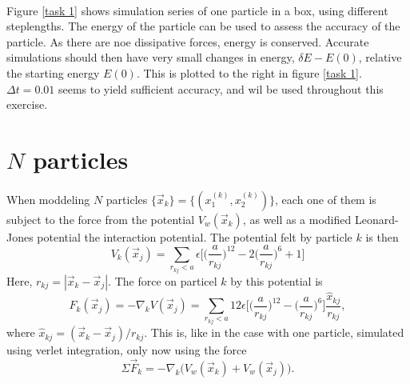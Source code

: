 \documentclass{article}
\begin{document}
        \paragraph*{}
        Figure \ref{task 1} shows simulation series of one particle in a box, using different steplengths. The energy of the particle can be used to assess the accuracy of the particle. As there are noe dissipative forces, energy is conserved. Accurate simulations should then have very small changes in energy, $\delta E - E(0)$, relative the starting energy $E(0)$. This is plotted to the right in figure \ref{task 1}. $\Delta t = 0.01$ seems to yield sufficient accuracy, and wil be used throughout this exercise.
        

    \section*{$N$ particles}
        When moddeling $N$ particles $\{ \vec x_k\} = \{ (x_1^{(k)}, x_2^{(k)}) \}$, each one of them is subject to the force from the potential $V_w(\vec x_k)$, as well as a modified Leonard-Jones potential the interaction potential. The potential felt by particle $k$ is then
        \begin{equation*}
            V_k(\vec x_j) = 
            \sum_{r_{kj}<a}\epsilon \bigg[ \bigg( \frac{a}{r_{kj}}\bigg)^{12} - 2\bigg(\frac{a}{r_{kj}}\bigg)^{6} + 1 \bigg]
        \end{equation*}
        Here, $r_{kj} = |\vec x_k - \vec x_j|$. The force on particel $k$ by this potential is
        \begin{equation*}
            F_k (\vec x_j) = -\nabla_k V(\vec x_j) = \sum_{r_{kj}<a} 12 \epsilon \bigg[ \bigg( \frac{a}{r_{kj}}\bigg)^{12} - \bigg(\frac{a}{r_{kj}}\bigg)^{6}\bigg] \frac{\hat x_{kj}}{r_{kj}},
        \end{equation*}
        where $\hat x_{kj} = (\vec x_k - \vec x_j) / r_{kj}$. This is, like in the case with one particle, simulated using verlet integration, only now using the force
        \begin{equation*}
            \Sigma \vec F_k = -\nabla_k \big( V_w(\vec x_k) + V_w(\vec x_j) \big).
        \end{equation*}
\end{document}
